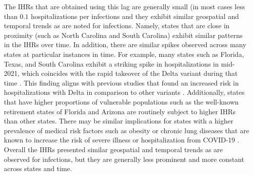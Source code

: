 \documentclass{article}
\begin{document}
The IHRs that are obtained using this lag are generally small (in most cases less than
$0.1$ hospitalizations per infections and they exhibit similar geospatial and temporal trends 
as are noted for infections. Namely, states that are close in proximity (such as North Carolina 
and South Carolina) exhibit similar patterns in the IHRs over time. In addition, there are similar
spikes observed across many states at particular instances in time. For example, many
states such as Florida, Texas, and South Carolina exhibit a striking spike in
hospitalizations in mid-2021, which coincides with the rapid takeover of the Delta variant
during that time \citep{hodcroft2021covariants}. This finding aligns with previous studies
that found an increased risk in hospitalizations with Delta in comparison to other
variants \citep{twohig2022hospital, nyberg2022comparative}. Additionally, states that have
higher proportions of vulnerable populations such as the well-known retirement states of
Florida and Arizona are routinely subject to higher IHRs than other states. There may be
similar implications for states with a higher prevalence of medical risk factors such as
obesity or chronic lung diseases that are known to increase the risk of severe illness or
hospitalization from COVID-19 \citep{phc2020people, cdc2020people}. Overall the IHRs
presented similar geospatial and temporal trends as are observed for infections, but they
are generally less prominent and more constant across states and time. %
\end{document}
